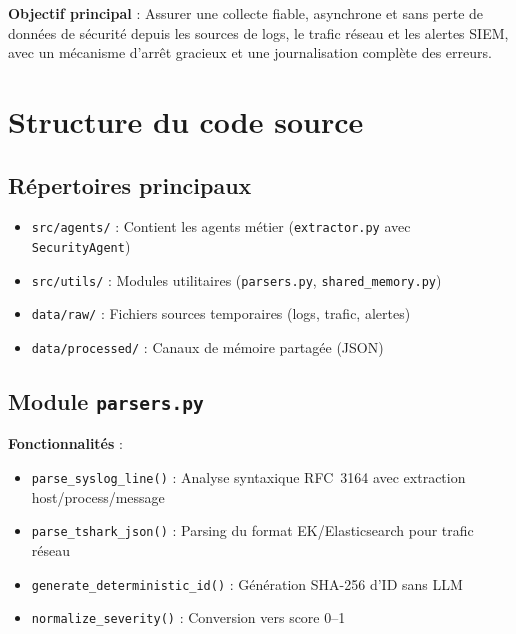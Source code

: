 \documentclass[a4paper,12pt]{article}
\begin{document}
\begin{tcolorbox}[
  enhanced,
  colback=codeBg,
  colframe=primaryBlue,
  left=8pt,
  right=8pt,
  top=8pt,
  bottom=8pt,
  boxrule=2pt,
  arc=4pt,
  before skip=12pt,
  after skip=12pt
]
\textbf{Objectif principal} : Assurer une collecte fiable, asynchrone et sans perte de données de sécurité depuis les sources de logs, le trafic réseau et les alertes SIEM, avec un mécanisme d'arrêt gracieux et une journalisation complète des erreurs.
\end{tcolorbox}

\section*{Structure du code source}

\subsection*{Répertoires principaux}

\begin{itemize}[label=\color{accentTeal}, leftmargin=*, itemsep=0.6em]
  \item \texttt{src/agents/} : Contient les agents métier (\texttt{extractor.py} avec \texttt{SecurityAgent})
  \item \texttt{src/utils/} : Modules utilitaires (\texttt{parsers.py}, \texttt{shared\_memory.py})
  \item \texttt{data/raw/} : Fichiers sources temporaires (logs, trafic, alertes)
  \item \texttt{data/processed/} : Canaux de mémoire partagée (JSON)
\end{itemize}

\subsection*{Module \texttt{parsers.py}}

\begin{tcolorbox}[
  enhanced,
  colback=white,
  colframe=accentTeal,
  left=6pt,
  right=6pt,
  top=6pt,
  bottom=6pt,
  boxrule=1pt,
  arc=4pt,
  before skip=8pt,
  after skip=8pt
]
\textbf{Fonctionnalités} :
\begin{itemize}[label=\color{primaryBlue}, leftmargin=*]
  \item \texttt{parse\_syslog\_line()} : Analyse syntaxique RFC~3164 avec extraction host/process/message
  \item \texttt{parse\_tshark\_json()} : Parsing du format EK/Elasticsearch pour trafic réseau
  \item \texttt{generate\_deterministic\_id()} : Génération SHA-256 d'ID sans LLM
  \item \texttt{normalize\_severity()} : Conversion vers score 0--1
\end{itemize}
\end{tcolorbox}
\end{document}
